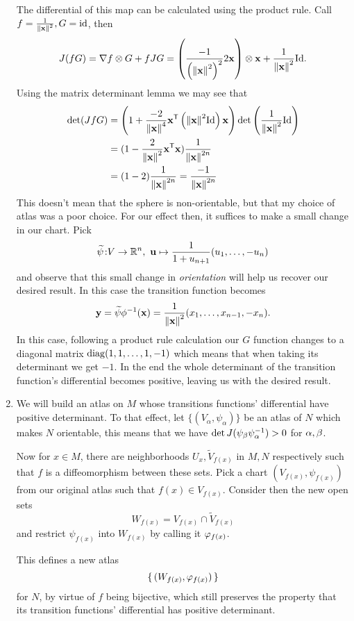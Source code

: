 \documentclass[12pt]{memoir}
\def\co{\colon}
\newcommand{\from}{\co\!\!}
\begin{document}
\begin{ptcbr}
\begin{enumerate}
	The differential of this map can be calculated using the product rule. Call $f=\frac{1}{\norm{\mathbf{x}}^2}, G=\operatorname{id}$, then 
	$$J(fG)=\nabla f\otimes G+fJG=\left(\frac{-1}{\left(\norm{\mathbf{x}}^2\right)^2}2\mathbf{x}\right)\otimes\mathbf{x}+\frac{1}{\norm{\mathbf{x}}^2}\mathrm{Id}.$$
	Using the matrix determinant lemma we may see that 
	\begin{align*}
		\det(JfG)&=\left(1+\frac{-2}{\norm{\mathbf{x}}^4}\mathbf{x}^{\mathsf{T}}\left(\norm{\mathbf{x}}^2\mathrm{Id}\right)\mathbf{x}\right)\det\left(\frac{1}{\norm{\mathbf{x}}^2}\mathrm{Id}\right)\\
		&=(1-\frac{2}{\norm{\mathbf{x}}^2}\mathbf{x}^{\mathsf{T}}\mathbf{x})\frac{1}{\norm{\mathbf{x}}^{2n}}\\
		&=(1-2)\frac{1}{\norm{\mathbf{x}}^{2n}}=\frac{-1}{\norm{\mathbf{x}}^{2n}}
	\end{align*}
	This doesn't mean that the sphere is non-orientable, but that my choice of atlas was a poor choice. For our effect then, it suffices to make a small change in our chart. Pick 
	$$\widetilde{\psi}\from V\to\bR^n,\ \vec u\mapsto \frac{1}{1+u_{n+1}}(u_1,\dots,-u_{n})$$
	and observe that this small change in \emph{orientation} will help us recover our desired result. In this case the transition function becomes 
	$$\mathbf{y}=\widetilde{\psi}\phi^{-1}(\mathbf{x})=\frac{1}{\norm{\mathbf{x}}^2}(x_1,\dots,x_{n-1},-x_n).$$
	In this case, following a product rule calculation our $G$ function changes to a diagonal matrix $\operatorname{diag}(1,1,\dots,1,-1)$ which means that when taking its determinant we get $-1$. In the end the whole determinant of the transition function's differential becomes positive, leaving us with the desired result.
	\item We will build an atlas on $M$ whose transitions functions' differential have positive determinant. To that effect, let $\{(V_\alpha, \psi_\alpha)\}$ be an atlas of $N$ which makes $N$ orientable, this means that we have $\det J(\psi_\beta \psi_\alpha^{-1})>0$ for $\alpha,\beta$.\par
	Now for $x\in M$, there are neighborhoods $U_x,\widetilde V_{f(x)}$ in $M,N$ respectively such that $f$ is a diffeomorphism between these sets. Pick a chart $(V_{f(x)},\psi_{f(x)})$ from our original atlas such that $f(x)\in V_{f(x)}$. Consider then the new open sets 
	$$W_{f(x)}=V_{f(x)}\cap \widetilde V_{f(x)}$$
	and restrict $\psi_{f(x)}$ into $W_{f(x)}$ by calling it $\varphi_{f(x)}$.\par
	This defines a new atlas
	$$\{\,(W_{f(x)},\varphi_{f(x)})\,\}$$ 
	for $N$, by virtue of $f$ being bijective, which still preserves the property that its transition functions' differential has positive determinant.\par

\end{enumerate}
\end{ptcbr}
\end{document}
